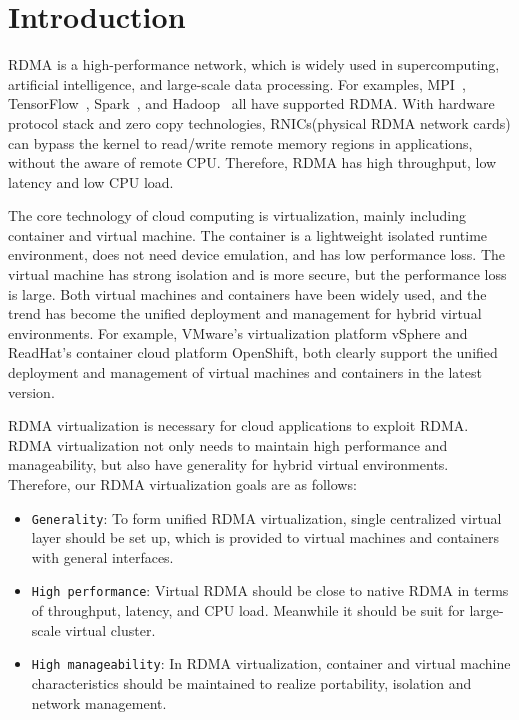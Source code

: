 \section{Introduction}
RDMA is a high-performance network, which is widely used in supercomputing, artificial intelligence, and large-scale data processing. For examples, MPI~\cite{mpi2004}, TensorFlow~\cite{abadi2016tensorflow}, Spark~\cite{spark-rdma}, and Hadoop~\cite{hadoop-rdma} all have supported RDMA. With hardware protocol stack and zero copy technologies, RNICs(physical RDMA network cards) can bypass the kernel to read/write remote memory regions in applications, without the aware of remote CPU. Therefore, RDMA has high throughput, low latency and low CPU load.

The core technology of cloud computing is virtualization, mainly including container and virtual machine. The container is a lightweight isolated runtime environment, does not need device emulation, and has low performance loss. The virtual machine has strong isolation and is more secure, but the performance loss is large. Both virtual machines and containers have been widely used, and the trend has become the unified deployment and management for hybrid virtual environments. For example, VMware's virtualization platform vSphere and ReadHat's container cloud platform OpenShift, both clearly support the unified deployment and management of virtual machines and containers in the latest version.

RDMA virtualization is necessary for cloud applications to exploit RDMA. RDMA virtualization not only needs to maintain high performance and manageability, but also have generality for hybrid virtual environments. Therefore, our RDMA virtualization goals are as follows:

\begin{itemize}
\item {\verb|Generality|}: To form unified RDMA virtualization, single centralized virtual layer should be set up, which is provided to virtual machines and containers with general interfaces.
\item {\verb|High performance|}: Virtual RDMA should be close to native RDMA in terms of throughput, latency, and CPU load. Meanwhile it should be suit for large-scale virtual cluster.
\item {\verb|High manageability|}: In RDMA virtualization, container and virtual machine characteristics should be maintained to realize portability, isolation and network management.
\end{itemize}

